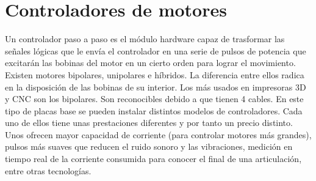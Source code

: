 \section{Controladores de motores}
\label{sec:controladorPAP}
Un controlador paso a paso es el módulo hardware capaz de trasformar las señales lógicas que le envía el controlador en una serie de pulsos de
potencia que excitarán las bobinas del motor en un cierto orden para lograr el movimiento. 
Existen motores bipolares, unipolares e híbridos. La diferencia entre ellos radica en la disposición de las bobinas de su interior. Los más usados 
en impresoras 3D y CNC son los bipolares. Son reconocibles debido a que tienen 4 cables.
En este tipo de placas base se pueden instalar distintos modelos de controladores. Cada uno de ellos tiene unas prestaciones diferentes y por tanto 
un precio distinto. Unos ofrecen mayor capacidad de corriente (para controlar motores más grandes), pulsos más suaves que reducen el 
ruido sonoro y las vibraciones, medición en tiempo real de la corriente consumida para conocer el final de una articulación, entre otras tecnologías.  

